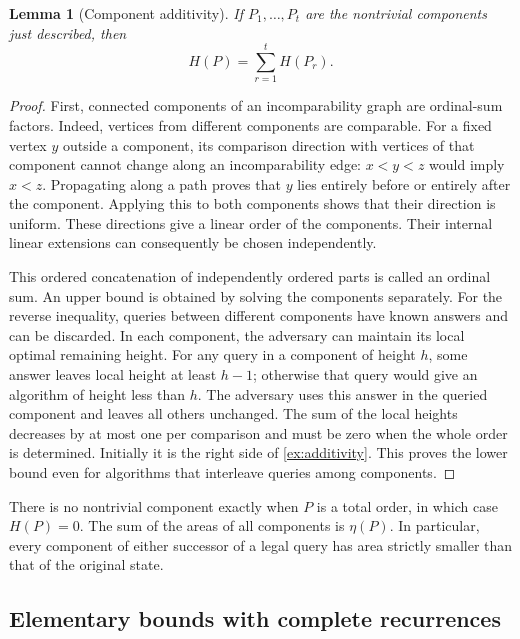 \documentclass[11pt]{article}
\newtheorem{lemma}[theorem]{Lemma}
\theoremstyle{definition}
\theoremstyle{remark}
\begin{document}
\begin{lemma}[Component additivity]\label{ex:component-lemma}
If $P_1,\ldots,P_t$ are the nontrivial components just described, then
\begin{equation}\label{ex:additivity}
                    H(P)=\sum_{r=1}^t H(P_r).
\end{equation}

\end{lemma}
\begin{proof}
First, connected components of an incomparability graph are ordinal-sum
factors.  Indeed, vertices from different components are comparable.  For a
fixed vertex $y$ outside a component, its comparison direction with vertices
of that component cannot change along an incomparability edge: $x<y<z$
would imply $x<z$.  Propagating along a path proves that $y$ lies entirely
before or entirely after the component.  Applying this to both components
shows that their direction is uniform.  These directions give a linear order
of the components.  Their internal linear extensions can consequently be
chosen independently.

This ordered concatenation of independently ordered parts is called an
ordinal sum. An upper bound is obtained by solving the components separately.  For the
reverse inequality, queries between different components have known answers
and can be discarded.  In each component, the adversary can maintain its
local optimal remaining height.  For any query in a component of height $h$,
some answer leaves local height at least $h-1$; otherwise that query would
give an algorithm of height less than $h$.  The adversary uses this answer in
the queried component and leaves all others unchanged.  The sum of the local
heights decreases by at most one per comparison and must be zero when the
whole order is determined.  Initially it is the right side of
\eqref{ex:additivity}.  This proves the lower bound even for algorithms that
interleave queries among components.
\end{proof}

There is no nontrivial component exactly when $P$ is a total order, in which
case $H(P)=0$.  The sum of the areas of all components is $\eta(P)$.  In
particular, every component of either successor of a legal query has area
strictly smaller than that of the original state.

\subsection{Elementary bounds with complete recurrences}
\end{document}
